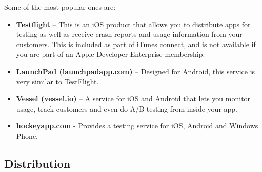 Some of the most popular ones are:
\begin{itemize}

 \item \textbf{Testflight}  – This is an iOS product that allows you to distribute apps for testing as well as receive crash reports and usage information from your customers. This is included as part of iTunes connect, and is not available if you are part of an Apple Developer Enterprise membership.
 \item \textbf{LaunchPad (launchpadapp.com)}  – Designed for Android, this service is very similar to TestFlight.
 \item \textbf{Vessel (vessel.io)}  – A service for iOS and Android that lets you monitor usage, track customers and even do A/B testing from inside your app.
 \item \textbf{hockeyapp.com } - Provides a testing service for iOS, Android and Windows Phone.
\end{itemize}


\subsection{Distribution}

